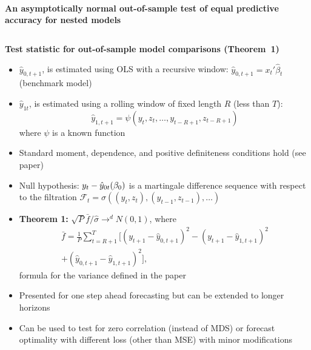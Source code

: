 \documentclass[final]{beamer}
\begin{document}
\begin{frame}{\\\centering \textbf{\huge An asymptotically normal out-of-sample
    test of equal predictive accuracy for nested models}}
\begin{columns}[t]
\begin{column}{.23\textwidth}
\begin{block}{\textbf{Test statistic for out-of-sample model
          comparisons (Theorem~1)}}
\begin{itemize}
          $y_t$
        \item $\hat{y}_{0,t+1}$, is estimated using OLS with a
          recursive window: $\hat{y}_{0,t+1} = x_t'\hat{\beta}_t$
          (benchmark model)
        \item $\hat{y}_{1t}$, is estimated using a rolling window of
          fixed length $R$ (less than $T$):
          \begin{equation*}
            \hat{y}_{1,t+1} = \psi(y_t,z_t,\dots,y_{t-R+1}, z_{t-R+1})
          \end{equation*}
          where $\psi$ is a known function
        \item Standard moment, dependence, and positive definiteness
          conditions hold (see paper)
        \item Null hypothesis: $y_t - \hat{y}_{0t}(\btrue)$
          is a martingale difference sequence with respect to the
          filtration $\mathcal{F}_t = \sigma((y_t, z_{t}), (y_{t-1},
          z_{t-1}),\dots)$
        \item \textbf{Theorem 1:} $\sqrt{P} \bar f / \hat\sigma \to^d
          N(0,1)$, where
          \begin{multline*}
            \bar f = \tfrac{1}{P} \sum_{t=R+1}^T \Big[(y_{t+1} - \hat y_{0,t+1})^2
            - (y_{t+1} - \hat{y}_{1,t+1})^2
            \\ + (\hat y_{0,t+1} - \hat{y}_{1,t+1})^2 \Big],
          \end{multline*}
          formula for the variance defined in the paper
        \item Presented for one step ahead forecasting but can be
          extended to longer horizons
        \item Can be used to test for zero correlation (instead of
          MDS) or forecast optimality with different loss (other than
          MSE) with minor modifications
        \end{itemize}
      \end{block}
    \end{column}


\end{columns}
\end{frame}
\end{document}
